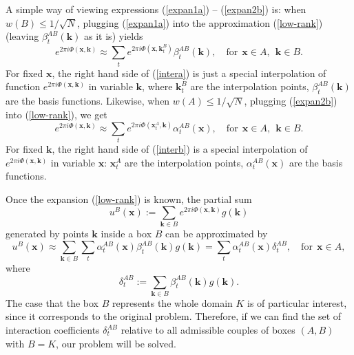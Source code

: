 
A simple way of viewing expressions (\ref{expan1a}) -- (\ref{expan2b}) is:  when $w(B)\leq1/\sqrt{N}$, plugging (\ref{expan1a}) into the approximation (\ref{low-rank}) (leaving $\beta_t^{AB}(\mathbf{k})$ as it is) yields
\begin{equation} \label{intera}
e^{2\pi i \Phi(\mathbf{x},\mathbf{k})}  \approx \sum_t 
e^{2\pi i \Phi(\mathbf{x},\mathbf{k}_t^B)}\beta_t^{AB}(\mathbf{k}), \quad \text{for} \  \  \mathbf{x}\in
A, \ \ \mathbf{k}\in B.
\end{equation}
For fixed $\mathbf{x}$, the right hand side of (\ref{intera}) is just a special interpolation of function $e^{2\pi i \Phi(\mathbf{x},\mathbf{k})}$ in variable $\mathbf{k}$, where $\mathbf{k}_t^B$ are the interpolation points, $\beta_t^{AB}(\mathbf{k})$ are the basis functions. Likewise, when $w(A)\leq1/\sqrt{N}$, plugging (\ref{expan2b}) into (\ref{low-rank}), we get
\begin{equation} \label{interb}
e^{2\pi i \Phi(\mathbf{x},\mathbf{k})}  \approx \sum_t 
e^{2\pi i \Phi(\mathbf{x}_t^A,\mathbf{k})}\alpha_t^{AB}(\mathbf{x}), \quad \text{for} \  \  \mathbf{x}\in A, \ \ \mathbf{k}\in B.
\end{equation}
For fixed $\mathbf{k}$, the right hand side of (\ref{interb}) is a special interpolation of $e^{2\pi i\Phi(\mathbf{x},\mathbf{k})}$ in variable $\mathbf{x}$: $\mathbf{x}_t^A$ are the interpolation points, $\alpha_t^{AB}(\mathbf{x})$ are the basis functions. 

Once the expansion (\ref{low-rank}) is known, the partial sum 
\begin{equation} \label{partial}
u^{B}(\mathbf{x}):=\sum_{\mathbf{k}\in B}e^{2\pi i
  \Phi(\mathbf{x},\mathbf{k})}g(\mathbf{k})
\end{equation}
generated by points $\mathbf{k}$ inside a box $B$ can be approximated by
\begin{equation} \label{partial1}
u^{B}(\mathbf{x})\approx  \sum_{\mathbf{k}\in B} \sum_t
\alpha_t^{AB}(\mathbf{x})\beta_t^{AB}(\mathbf{k}) g(\mathbf{k}) =
\sum_t \alpha_t^{AB}(\mathbf{x})\delta_t^{AB},  \quad \text{for} \  \ \mathbf{x}\in A,
\end{equation}
where
\begin{equation} \label{def}
\delta_t^{AB}:=\sum_{\mathbf{k}\in B} \beta_t^{AB}(\mathbf{k})g(\mathbf{k}).
\end{equation}
The case that the box $B$ represents the whole domain $K$ is of particular interest, since it corresponds to the original problem. Therefore, if we can find the set of interaction coefficients $\delta_t^{AB}$ relative to all admissible couples of boxes $(A,B)$ with $B=K$, our problem will be solved. 

